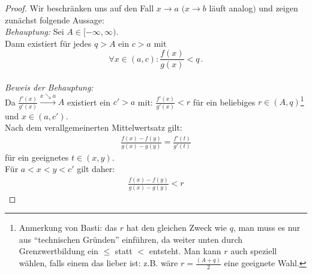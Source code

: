 \begin{proof}
	Wir beschränken uns auf den Fall $x \rightarrow a$ 
	$(x \rightarrow b$ läuft analog$)$ und zeigen zunächst folgende Aussage: \\
	\emph{Behauptung:} Sei $A \in [-\infty, \infty)$. \\ 
	Dann existiert für jedes $q > A$ ein $c > a$ mit
	 $$\forall x\in (a,c): \frac{f(x)}{g(x)} < q \,.$$ \\
	\emph{Beweis der Behauptung:} \\
	Da $\frac{f'(x)}{g'(x)} \xrightarrow{{x \searrow a}} A$ 
	existiert ein $c' > a$ mit: $\frac{f'(x)}{g'(x)}<r$ für ein beliebiges 
	$r \in (A,q)$\footnote{Anmerkung von Basti: das $r$ hat den gleichen Zweck wie $q$, man muss es nur aus \enquote{technischen Gründen} einführen, da weiter unten durch Grenzwertbildung ein $\leq$ statt $<$ entsteht. Man kann $r$ auch speziell wählen, falls einem das lieber ist: z.B. wäre $r=\frac{(A+q)}{2}$ eine geeignete Wahl.} und $x \in (a,c')$.\\
	Nach dem verallgemeinerten Mittelwertsatz gilt:
	\begin{align}
		\label{gleichung_beweis_lh_1}
		\frac{f(x)-f(y)}{g(x)-g(y)} = \frac{f'(t)}{g'(t)}
	\end{align}
	für ein geeignetes $t \in  (x,y)$. \\
	Für $a < x < y <c'$ gilt daher:
	\begin{align}
		\label{gleichung_beweis_lh_2}
		\frac{f(x)-f(y)}{g(x)-g(y)} < r
	\end{align}


\end{proof}
